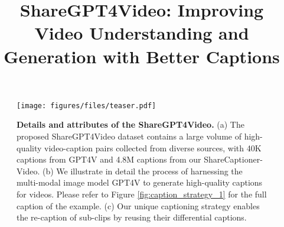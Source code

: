 \title{ShareGPT4Video: Improving Video Understanding and Generation with Better Captions}



\maketitle

\begin{figure}[h]
    \centering
    \vspace{-30pt}
    \texttt{[image: figures/files/teaser.pdf]}
    \caption{\textbf{Details and attributes of the ShareGPT4Video.} (a) The proposed ShareGPT4Video dataset contains a large volume of high-quality video-caption pairs collected from diverse sources, with 40K captions from GPT4V and 4.8M captions from our ShareCaptioner-Video.
    (b) We illustrate in detail the process of harnessing the multi-modal image model GPT4V \cite{gpt4v} to generate high-quality captions for videos.  Please refer to Figure \ref{fig:caption_strategy_1} for the full caption of the example.
    (c) Our unique captioning strategy enables the re-caption of sub-clips by reusing their differential captions.} 
    \label{fig:teaser}
\end{figure}

